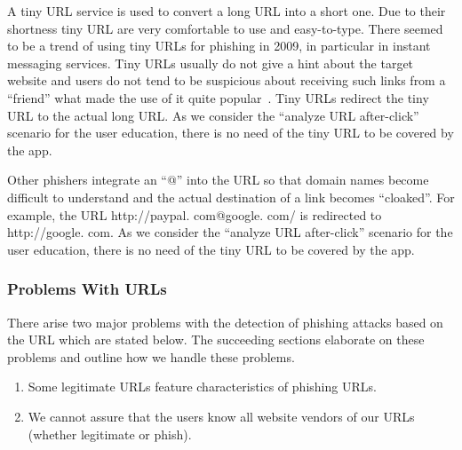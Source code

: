 \begin{description}[leftmargin=0cm]
	\item[Tiny URLs] A tiny URL service is used to convert a long URL into a short one.
 Due to their shortness tiny URL are very comfortable to use and easy-to-type.
 There seemed to be a trend of using tiny URLs for phishing in 2009, in particular in instant messaging services.
 Tiny URLs usually do not give a hint about the target website and users do not tend to be suspicious about receiving such links from a ``friend'' what made the use of it quite popular~\cite{tinyurlpcworld}. Tiny URLs redirect the tiny URL to the actual long URL.
 As we consider the ``analyze URL after-click'' scenario for the user education, there is no need of the tiny URL to be covered by the app.

		\item[Cloaked URLs] Other phishers integrate an ``@'' into the URL so that domain names become difficult to understand and the actual destination of a link becomes ``cloaked''\cite{alnajim2009fighting}. For example, the URL http://paypal.
com@google.
com/ is redirected to http://google.
com.
 As we consider the ``analyze URL after-click'' scenario for the user education, there is no need of the tiny URL to be covered by the app.

\end{description}

\subsubsection{Problems With URLs}
\label{s:problems_with_URLs}
There arise two major problems with the detection of phishing attacks based on the URL which are stated below. 
The succeeding sections elaborate on these problems and outline how we handle these problems.

\begin{enumerate}
	\item Some legitimate URLs feature characteristics of phishing URLs.
	\item We cannot assure that the users know all website vendors of our URLs (whether legitimate or phish).
\end{enumerate}

